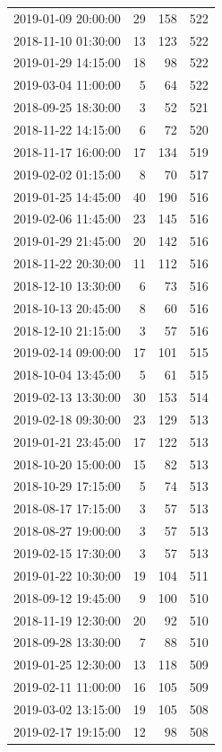 \begin{tabular}{lrrr}
2019-01-09 20:00:00 & 29 & 158 & 522 \\
2018-11-10 01:30:00 & 13 & 123 & 522 \\
2019-01-29 14:15:00 & 18 & 98 & 522 \\
2019-03-04 11:00:00 & 5 & 64 & 522 \\
2018-09-25 18:30:00 & 3 & 52 & 521 \\
2018-11-22 14:15:00 & 6 & 72 & 520 \\
2018-11-17 16:00:00 & 17 & 134 & 519 \\
2019-02-02 01:15:00 & 8 & 70 & 517 \\
2019-01-25 14:45:00 & 40 & 190 & 516 \\
2019-02-06 11:45:00 & 23 & 145 & 516 \\
2019-01-29 21:45:00 & 20 & 142 & 516 \\
2018-11-22 20:30:00 & 11 & 112 & 516 \\
2018-12-10 13:30:00 & 6 & 73 & 516 \\
2018-10-13 20:45:00 & 8 & 60 & 516 \\
2018-12-10 21:15:00 & 3 & 57 & 516 \\
2019-02-14 09:00:00 & 17 & 101 & 515 \\
2018-10-04 13:45:00 & 5 & 61 & 515 \\
2019-02-13 13:30:00 & 30 & 153 & 514 \\
2019-02-18 09:30:00 & 23 & 129 & 513 \\
2019-01-21 23:45:00 & 17 & 122 & 513 \\
2018-10-20 15:00:00 & 15 & 82 & 513 \\
2018-10-29 17:15:00 & 5 & 74 & 513 \\
2018-08-17 17:15:00 & 3 & 57 & 513 \\
2018-08-27 19:00:00 & 3 & 57 & 513 \\
2019-02-15 17:30:00 & 3 & 57 & 513 \\
2019-01-22 10:30:00 & 19 & 104 & 511 \\
2018-09-12 19:45:00 & 9 & 100 & 510 \\
2018-11-19 12:30:00 & 20 & 92 & 510 \\
2018-09-28 13:30:00 & 7 & 88 & 510 \\
2019-01-25 12:30:00 & 13 & 118 & 509 \\
2019-02-11 11:00:00 & 16 & 105 & 509 \\
2019-03-02 13:15:00 & 19 & 105 & 508 \\
2019-02-17 19:15:00 & 12 & 98 & 508 \\

\end{tabular}
